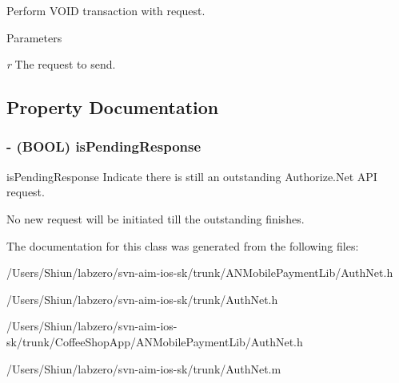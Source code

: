 Perform VOID transaction with request. 


\begin{DoxyParams}{Parameters}
\item[{\em r}]The request to send. \end{DoxyParams}


\subsection{Property Documentation}
\hypertarget{interface_auth_net_a7cb6478b15ab6c0cffb29eaf53db9d49}{
\subsubsection[{isPendingResponse}]{\setlength{\rightskip}{0pt plus 5cm}-\/ (BOOL) isPendingResponse}}
\label{interface_auth_net_a7cb6478b15ab6c0cffb29eaf53db9d49}


isPendingResponse Indicate there is still an outstanding Authorize.Net API request. 

No new request will be initiated till the outstanding finishes. 

The documentation for this class was generated from the following files:\begin{DoxyCompactItemize}
\item 
/Users/Shiun/labzero/svn-\/aim-\/ios-\/sk/trunk/ANMobilePaymentLib/AuthNet.h\item 
/Users/Shiun/labzero/svn-\/aim-\/ios-\/sk/trunk/AuthNet.h\item 
/Users/Shiun/labzero/svn-\/aim-\/ios-\/sk/trunk/CoffeeShopApp/ANMobilePaymentLib/AuthNet.h\item 
/Users/Shiun/labzero/svn-\/aim-\/ios-\/sk/trunk/AuthNet.m\end{DoxyCompactItemize}
